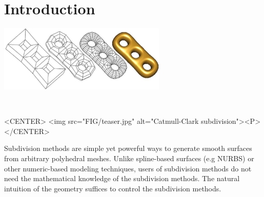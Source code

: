 
\ccParDims

\label{chapterSubdivision}



\minitoc

\section{Introduction} \label{sectionSubIntro}
\begin{ccTexOnly}
  \begin{center}
    \parbox{0.6\textwidth}{%
      \includegraphics[width=0.6\textwidth]{Subdivision_method_3/FIG/teaser}
    }\\ \vspace{0.5cm}
  \end{center}
\end{ccTexOnly}

\begin{ccHtmlOnly}
     <CENTER>
         <img src="FIG/teaser.jpg" alt="Catmull-Clark subdivision"><P>
     </CENTER>
\end{ccHtmlOnly}

Subdivision methods are simple yet powerful ways to 
generate smooth surfaces from arbitrary polyhedral meshes. 
Unlike spline-based surfaces (e.g NURBS) or other numeric-based 
modeling techniques, users of subdivision
methods do not need the mathematical knowledge of 
the subdivision methods. 
The natural intuition of the geometry suffices to control the 
subdivision methods. 

